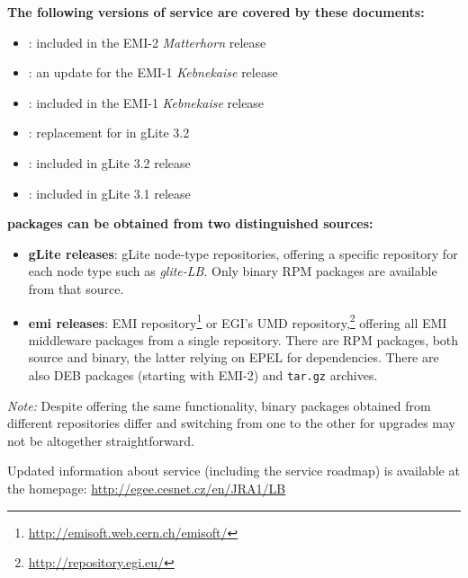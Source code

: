 \textbf{The following versions of \LB service are covered by these documents:}
\begin{itemize}
\item {}: included in the EMI-2 \emph{Matterhorn} release
\item {}: an update for the EMI-1 \emph{Kebnekaise} release
\item {}: included in the EMI-1 \emph{Kebnekaise} release
\item {}: replacement for  in gLite 3.2
\item {}: included in gLite 3.2 release
\item {}: included in gLite 3.1 release
\end{itemize}

\textbf{\LB packages can be obtained from two distinguished sources:}

\nopagebreak
\begin{itemize}
\item \textbf{gLite releases}: gLite node-type repositories, offering a specific repository for each node type such as \emph{glite-LB}. Only binary RPM packages are available from that source.
\item \textbf{emi releases}: EMI repository\footnote{\url{http://emisoft.web.cern.ch/emisoft/}} or EGI's UMD repository,\footnote{\url{http://repository.egi.eu/}} offering all EMI middleware packages from a single repository. There are RPM packages, both source and binary, the latter relying on EPEL for dependencies. There are also DEB packages (starting with EMI-2) and \texttt{tar.gz} archives.
\end{itemize}

\emph{Note:} Despite offering the same functionality, binary packages obtained from different repositories differ and switching from one to the other for upgrades may not be altogether straightforward.

Updated information about \LB service (including the \LB service roadmap) is available at the
\LB homepage:
\href{http://egee.cesnet.cz/en/JRA1/LB}{http://egee.cesnet.cz/en/JRA1/LB}

